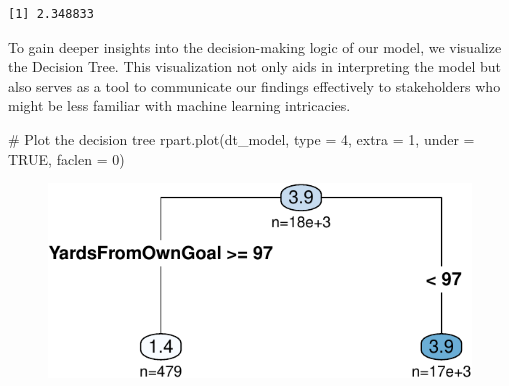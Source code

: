 \documentclass[
  super,
  preprint,
  3p]{elsarticle}
\newenvironment{Shaded}{\begin{snugshade}}{\end{snugshade}}
\newcommand{\AttributeTok}[1]{\textcolor[rgb]{0.40,0.45,0.13}{#1}}
\newcommand{\CommentTok}[1]{\textcolor[rgb]{0.37,0.37,0.37}{#1}}
\newcommand{\ConstantTok}[1]{\textcolor[rgb]{0.56,0.35,0.01}{#1}}
\newcommand{\DecValTok}[1]{\textcolor[rgb]{0.68,0.00,0.00}{#1}}
\newcommand{\FloatTok}[1]{\textcolor[rgb]{0.68,0.00,0.00}{#1}}
\newcommand{\FunctionTok}[1]{\textcolor[rgb]{0.28,0.35,0.67}{#1}}
\newcommand{\NormalTok}[1]{\textcolor[rgb]{0.00,0.23,0.31}{#1}}
\newcommand{\OtherTok}[1]{\textcolor[rgb]{0.00,0.23,0.31}{#1}}
\newcommand{\SpecialCharTok}[1]{\textcolor[rgb]{0.37,0.37,0.37}{#1}}
\newcommand{\StringTok}[1]{\textcolor[rgb]{0.13,0.47,0.30}{#1}}
\begin{document}
\begin{Shaded}
\end{Shaded}

\begin{verbatim}
[1] 2.348833
\end{verbatim}

To gain deeper insights into the decision-making logic of our model, we
visualize the Decision Tree. This visualization not only aids in
interpreting the model but also serves as a tool to communicate our
findings effectively to stakeholders who might be less familiar with
machine learning intricacies.

\begin{Shaded}
\begin{Highlighting}[]
\CommentTok{\# Plot the decision tree}
\FunctionTok{rpart.plot}\NormalTok{(dt\_model, }\AttributeTok{type =} \DecValTok{4}\NormalTok{, }\AttributeTok{extra =} \DecValTok{1}\NormalTok{, }\AttributeTok{under =} \ConstantTok{TRUE}\NormalTok{, }\AttributeTok{faclen =} \DecValTok{0}\NormalTok{)}
\end{Highlighting}
\end{Shaded}

\begin{figure}[H]

{\centering \includegraphics{project_report_files/figure-pdf/unnamed-chunk-48-1.pdf}

}

\end{figure}
\end{document}
